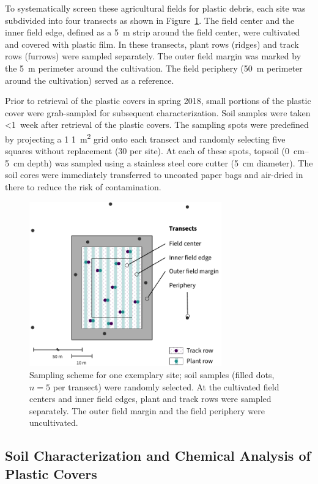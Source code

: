 To systematically screen these agricultural fields for plastic debris, each site was subdivided into four transects as shown in Figure~\ref{fig:transects}. The field center and the inner field edge, defined as a \SI{5}{\meter} strip around the field center, were cultivated and covered with plastic film. In these transects, plant rows (ridges) and track rows (furrows) were sampled separately. The outer field margin was marked by the \SI{5}{\meter} perimeter around the cultivation. The field periphery (\SI{50}{\meter} perimeter around the cultivation) served as a reference.

Prior to retrieval of the plastic covers in spring 2018, small portions of the plastic cover were grab-sampled for subsequent characterization.
Soil samples were taken \SI{<1}{week} after retrieval of the plastic covers. The sampling spots were predefined by projecting a \num{1}\,\texttimes\,\SI{1}{\square\meter} grid onto each transect and randomly selecting five squares without replacement (30 per site). At each of these spots, topsoil (\SIrange{0}{5}{\centi\meter} depth) was sampled using a stainless steel core cutter (\SI{5}{\centi\meter} diameter). The soil cores were immediately transferred to uncoated paper bags and air-dried in there to reduce the risk of contamination.

\begin{figure}
	\centering
	\includegraphics[width=3.267in]{figures/transects}
	\caption[Sampling scheme.]{Sampling scheme for one exemplary site; soil samples (filled dots, $n = 5$ per transect) were randomly selected. At the cultivated field centers and inner field edges, plant and track rows were sampled separately. The outer field margin and the field periphery were uncultivated.}
	\label{fig:transects}
\end{figure}

\subsection{Soil Characterization and Chemical Analysis of Plastic Covers}
\label{subsec:characterization}


